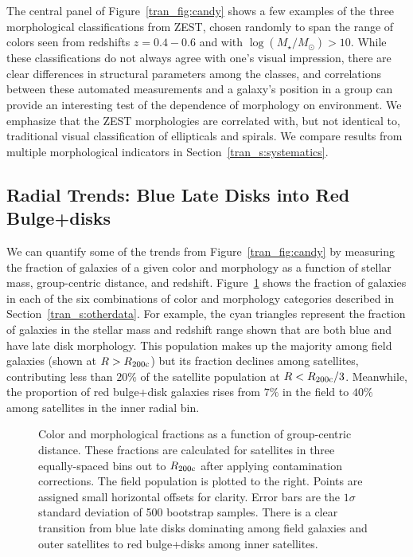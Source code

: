 The central panel of Figure~\ref{tran_fig:candy} shows a few examples of
the three morphological classifications from ZEST, chosen randomly to
span the range of colors seen from redshifts $z=0.4-0.6$ and with
$\log(M_{\star}/M_{\odot})>10$. While these classifications do not
always agree with one's visual impression, there are clear differences
in structural parameters among the classes, and correlations between these automated
measurements and a galaxy's position in a group can provide an
interesting test of the dependence of morphology on environment. We
emphasize that the ZEST morphologies are correlated with, but not
identical to, traditional visual classification of ellipticals and
spirals. We compare results from multiple morphological indicators in
Section~\ref{tran_s:systematics}.

\subsection{Radial Trends: Blue Late Disks into Red Bulge+disks}
\label{tran_s:rtrends}

We can quantify some of the trends from Figure~\ref{tran_fig:candy} by
measuring the fraction of galaxies of a given color and morphology as
a function of stellar mass, group-centric distance, and
redshift. Figure~\ref{tran_fig:satrad_single} shows the fraction of
galaxies in each of the six combinations of color and morphology
categories described in Section~\ref{tran_s:otherdata}. For example, the
cyan triangles represent the fraction of galaxies in the stellar mass
and redshift range shown that are both blue and have late disk
morphology. This population makes up the majority among field galaxies
(shown at $R > R_{\rm 200c}$) but its fraction declines among
satellites, contributing less than $20\%$ of the satellite population
at $R < R_{\rm 200c}/3$. Meanwhile, the proportion of red bulge+disk
galaxies rises from $7\%$ in the field to $40\%$ among satellites in
the inner radial bin.

\begin{figure}[htb]
\caption{Color and morphological fractions as a function of
  group-centric distance. These fractions are calculated for
  satellites in three equally-spaced bins out to $R_{\rm 200c}$ after
  applying contamination corrections. The field population is plotted
  to the right. Points are assigned small horizontal offsets for
  clarity. Error bars are the $1\sigma$ standard deviation of 500
  bootstrap samples. There is a clear transition from blue late disks
  dominating among field galaxies and outer satellites to red
  bulge+disks among inner satellites.}
\label{tran_fig:satrad_single}
\end{figure}

